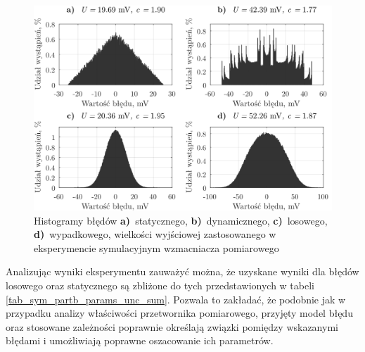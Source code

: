 \begin{figure}[htb!]
\begin{center}
\includegraphics{obrazki/hist_part_b}
\caption{Histogramy błędów \textbf{a)}~statycznego, \textbf{b)}~dynamicznego, \textbf{c)}~losowego, \textbf{d)}~wypadkowego, wielkości wyjściowej zastosowanego w eksperymencie symulacyjnym wzmacniacza pomiarowego \label{fig_symul_partb_hist}}
\end{center}
\end{figure}

Analizując wyniki eksperymentu zauważyć można, że uzyskane wyniki dla błędów losowego oraz statycznego są zbliżone do tych przedstawionych w tabeli \ref{tab_sym_partb_params_unc_sum}. Pozwala to zakładać, że podobnie jak w przypadku analizy właściwości przetwornika pomiarowego, przyjęty model błędu oraz stosowane zależności poprawnie określają związki pomiędzy wskazanymi błędami i umożliwiają poprawne oszacowanie ich parametrów.

